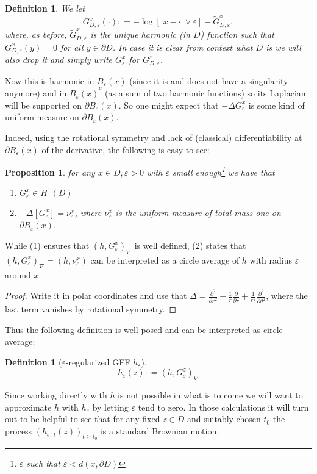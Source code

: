 \documentclass[11pt,reqno]{amsart}
\numberwithin{equation}{section}
\newtheorem{pro}[thm]{Proposition}
\newtheorem{defi}[thm]{Definition}
\newcommand{\deq}{\mathrel{\mathop:}=}
\newcommand{\eps}{\varepsilon}
\begin{document}
\begin{defi}
	We let
	$$G_{D,\eps}^x(\cdot)\deq -\log[|x-\cdot|\vee \eps]-\tilde G_{D,\eps}^x,$$
	where, as before, $\tilde G_{D,\eps}^x$ is the unique harmonic (in $D$) function such that $G_{D,\eps}^x(y)=0$ for all $y\in \partial D$. In case it is clear from context what $D$ is we will also drop it and simply write $G_\eps^x$ for $G_{D,\eps}^x$.
\end{defi}

Now this is harmonic in $B_\eps(x)$ (since it is and does not have a singularity anymore) and in $\overline{B_\eps(x)}^c$ (as a sum of two harmonic functions) so its Laplacian will be supported on $\partial B_\eps(x)$. So one might expect that $-\Delta G_\eps^x$ is some kind of uniform measure on $\partial B_\eps(x)$. 

Indeed, using the rotational symmetry and lack of (classical) differentiability at $\partial B_\eps(x)$ of the derivative, the following is easy to see:

\begin{pro}\label{prop:circleAvg}
	for any $x\in D, \eps>0$ with $\eps$ small enough\footnote{$\eps$ such that $\eps<d(x,\partial D)$} we have that 
	\begin{enumerate}
		\item $G_\eps^x\in H^1(D)$
		\item $-\Delta[G_\eps^x] = \nu_\eps^x$, where $\nu_\eps^x$ is the uniform measure of total mass one on $\partial B_\eps(x)$.
	\end{enumerate}
\end{pro}

While (1) ensures that $(h,G_\eps^x)_\nabla$ is well defined, (2) states that $(h,G_\eps^x)_\nabla = (h,\nu_\eps^x)$ can be interpreted as a circle average of $h$ with radius $\eps$ around $x$.
\begin{proof}
	Write it in polar coordinates and use that $\Delta = \frac{\partial^2}{\partial r^2}+\frac{1}{r}\frac{\partial}{\partial r}+\frac{1}{r^2}\frac{\partial^2}{\partial\theta^2}$, where the last term vanishes by rotational symmetry.
\end{proof}

Thus the following definition is well-posed and can be interpreted as circle average:

\begin{defi}[$\eps$-regularized GFF $h_\eps$]
	$$h_\eps(z)\deq (h,G_\eps^z)_\nabla$$
\end{defi}

Since working directly with $h$ is not possible in what is to come we will want to approximate $h$ with $h_\eps$ by letting $\eps$ tend to zero. In those calculations it will turn out to be helpful to see that for any fixed $z\in D$ and suitably chosen $t_0$ the process $(h_{e^-t}(z))_{t\geq t_0}$ is a standard Brownian motion.
\end{document}
